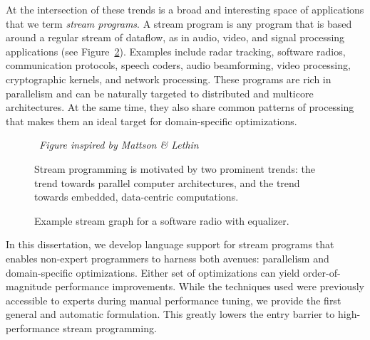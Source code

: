 At the intersection of these trends is a broad and interesting space
of applications that we term {\it stream programs}.  A stream program
is any program that is based around a regular stream of dataflow, as
in audio, video, and signal processing applications (see
Figure~\ref{fig:stream-graph}).  
Examples include radar tracking, software radios, communication
protocols, speech coders, audio beamforming, video processing,
cryptographic kernels, and network processing.  These programs are
rich in parallelism and can be naturally targeted to distributed and
multicore architectures.  At the same time, they also share common
patterns of processing that makes them an ideal target for
domain-specific optimizations.

\newcommand{\myfigwidth}[0]{3.5in}
\begin{figure}[t]
\begin{center}
\psfig{file=intersection.eps,width=\myfigwidth}
\end{center}
\vspace{-32pt}
{\mbox{~}\hfill \it \scriptsize Figure inspired by Mattson \& Lethin~\cite{mattson_streaming_2003}}
\vspace{4pt}
\caption[Stream programming is motivated by architecture and
  application trends]{Stream programming is motivated by two prominent
  trends: the trend towards parallel computer architectures, and the
  trend towards embedded, data-centric
  computations.\protect\label{fig:intersection}}
\end{figure}

\begin{figure}[t]
\centering{}
\caption{Example stream graph for a software radio with equalizer.\protect\label{fig:stream-graph}}
\end{figure}

In this dissertation, we develop language support for stream programs
that enables non-expert programmers to harness both avenues:
parallelism and domain-specific optimizations.  Either set of
optimizations can yield order-of-magnitude performance improvements.
While the techniques used were previously accessible to experts during
manual performance tuning, we provide the first general and automatic
formulation.  This greatly lowers the entry barrier to
high-performance stream programming.


